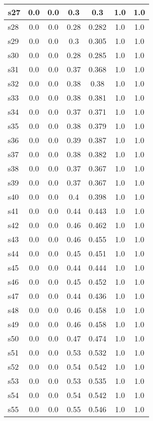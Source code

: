 \documentclass{article}
\begin{document}
\begin{tabular}{|l|c|c|c|c|c|c|}
s27 &0.0 & 0.0 & 0.3 & 0.3 & 1.0 & 1.0\\
\hline
s28 &0.0 & 0.0 & 0.28 & 0.282 & 1.0 & 1.0\\
\hline
s29 &0.0 & 0.0 & 0.3 & 0.305 & 1.0 & 1.0\\
\hline
s30 &0.0 & 0.0 & 0.28 & 0.285 & 1.0 & 1.0\\
\hline
s31 &0.0 & 0.0 & 0.37 & 0.368 & 1.0 & 1.0\\
\hline
s32 &0.0 & 0.0 & 0.38 & 0.38 & 1.0 & 1.0\\
\hline
s33 &0.0 & 0.0 & 0.38 & 0.381 & 1.0 & 1.0\\
\hline
s34 &0.0 & 0.0 & 0.37 & 0.371 & 1.0 & 1.0\\
\hline
s35 &0.0 & 0.0 & 0.38 & 0.379 & 1.0 & 1.0\\
\hline
s36 &0.0 & 0.0 & 0.39 & 0.387 & 1.0 & 1.0\\
\hline
s37 &0.0 & 0.0 & 0.38 & 0.382 & 1.0 & 1.0\\
\hline
s38 &0.0 & 0.0 & 0.37 & 0.367 & 1.0 & 1.0\\
\hline
s39 &0.0 & 0.0 & 0.37 & 0.367 & 1.0 & 1.0\\
\hline
s40 &0.0 & 0.0 & 0.4 & 0.398 & 1.0 & 1.0\\
\hline
s41 &0.0 & 0.0 & 0.44 & 0.443 & 1.0 & 1.0\\
\hline
s42 &0.0 & 0.0 & 0.46 & 0.462 & 1.0 & 1.0\\
\hline
s43 &0.0 & 0.0 & 0.46 & 0.455 & 1.0 & 1.0\\
\hline
s44 &0.0 & 0.0 & 0.45 & 0.451 & 1.0 & 1.0\\
\hline
s45 &0.0 & 0.0 & 0.44 & 0.444 & 1.0 & 1.0\\
\hline
s46 &0.0 & 0.0 & 0.45 & 0.452 & 1.0 & 1.0\\
\hline
s47 &0.0 & 0.0 & 0.44 & 0.436 & 1.0 & 1.0\\
\hline
s48 &0.0 & 0.0 & 0.46 & 0.458 & 1.0 & 1.0\\
\hline
s49 &0.0 & 0.0 & 0.46 & 0.458 & 1.0 & 1.0\\
\hline
s50 &0.0 & 0.0 & 0.47 & 0.474 & 1.0 & 1.0\\
\hline
s51 &0.0 & 0.0 & 0.53 & 0.532 & 1.0 & 1.0\\
\hline
s52 &0.0 & 0.0 & 0.54 & 0.542 & 1.0 & 1.0\\
\hline
s53 &0.0 & 0.0 & 0.53 & 0.535 & 1.0 & 1.0\\
\hline
s54 &0.0 & 0.0 & 0.54 & 0.542 & 1.0 & 1.0\\
\hline
s55 &0.0 & 0.0 & 0.55 & 0.546 & 1.0 & 1.0\\

\end{tabular}
\end{document}
